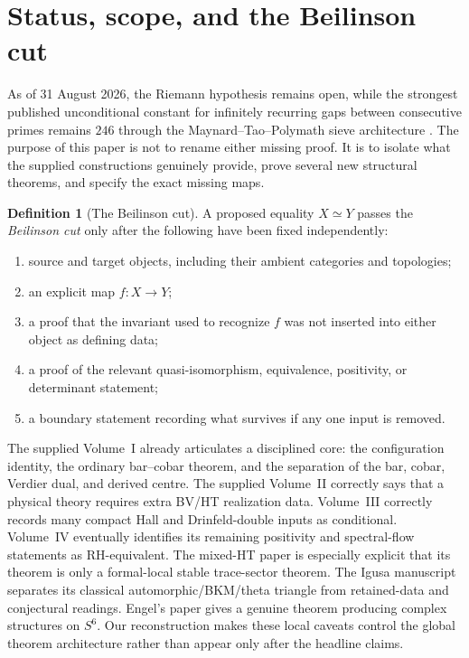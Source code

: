 \documentclass[11pt]{article}
\theoremstyle{definition}
\newtheorem{definition}[theorem]{Definition}
\theoremstyle{remark}
\newcommand{\1}{\mathbf 1}
\begin{document}
\tableofcontents

\section{Status, scope, and the Beilinson cut}

As of 31 August 2026, the Riemann hypothesis remains open, while the strongest published unconditional constant for infinitely recurring gaps between consecutive primes remains $246$ through the Maynard--Tao--Polymath sieve architecture \cite{Maynard2015,Polymath2014}.  The purpose of this paper is not to rename either missing proof.  It is to isolate what the supplied constructions genuinely provide, prove several new structural theorems, and specify the exact missing maps.

\begin{definition}[The Beilinson cut]
A proposed equality $X\simeq Y$ passes the \emph{Beilinson cut} only after the following have been fixed independently:
\begin{enumerate}[label=(B\arabic*)]
\item source and target objects, including their ambient categories and topologies;
\item an explicit map $f:X\to Y$;
\item a proof that the invariant used to recognize $f$ was not inserted into either object as defining data;
\item a proof of the relevant quasi-isomorphism, equivalence, positivity, or determinant statement;
\item a boundary statement recording what survives if any one input is removed.
\end{enumerate}
\end{definition}

The supplied Volume~I already articulates a disciplined core: the configuration identity, the ordinary bar--cobar theorem, and the separation of the bar, cobar, Verdier dual, and derived centre.  The supplied Volume~II correctly says that a physical theory requires extra BV/HT realization data.  Volume~III correctly records many compact Hall and Drinfeld-double inputs as conditional.  Volume~IV eventually identifies its remaining positivity and spectral-flow statements as RH-equivalent.  The mixed-HT paper is especially explicit that its theorem is only a formal-local stable trace-sector theorem.  The Igusa manuscript separates its classical automorphic/BKM/theta triangle from retained-data and conjectural readings.  Engel's paper gives a genuine theorem producing complex structures on $S^6$.  Our reconstruction makes these local caveats control the global theorem architecture rather than appear only after the headline claims.
\end{document}
